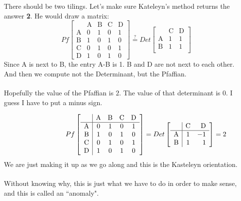 \documentclass[12pt]{article}
\begin{document}
There should be two tilings.  Let's make sure Kateleyn's method returns the answer \textbf{2}.  He would draw a matrix:
$$ Pf \left[ \begin{array}{c|cccc}
 & \text{A} & \text{B} & \text{C} & \text{D} \\ \hline
\text{A} & 0 & 1 &  0 &  1 \\
\text{B} & 1 & 0 &  1 &  0 \\ 
\text{C} & 0 & 1 &  0 &  1 \\
\text{D} & 1 & 0 &  1 &  0 
 \end{array}\right] \stackrel{?}{=} Det 
 \left[ \begin{array}{c|cc}
 & \text{C} & \text{D} \\ \hline
\text{A} & 1 & 1  \\
\text{B} & 1 & 1  \\ 
 \end{array}\right]
 $$
Since A is next to B, the entry A-B is 1.  B and D are not next to each other.  And then we compute not the Determinant, but the Pfaffian. \\ \\
Hopefully the value of the Pfaffian is $2$.  The value of that determinant is $0$.
I guess I have to put a minus sign.

$$ \hspace{0.8in} Pf \left[ \begin{array}{c|cccc}
 & \text{A} & \text{B} & \text{C} & \text{D} \\ \hline
\text{A} & 0 & 1 &  0 &  1 \\
\text{B} & 1 & 0 &  1 &  0 \\ 
\text{C} & 0 & 1 &  0 &  1 \\
\text{D} & 1 & 0 &  1 &  0 
 \end{array}\right] = Det 
 \left[ \begin{array}{c|cr}
 & \text{C} & \text{D} \\ \hline
\text{A} & 1 & -1  \\
\text{B} & 1 & 1  \\ 
 \end{array}\right] = 2
 $$
We are just making it up as we go along and this is the Kasteleyn orientation. \\ \\ Without knowing why, this is just what we have to do in order to make sense, and this is called an ``anomaly".


\newpage
\end{document}
